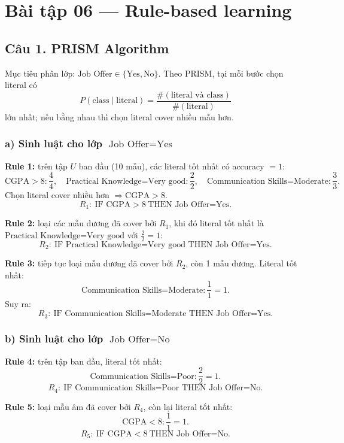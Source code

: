 \section*{Bài tập 06 --- Rule-based learning}

\subsection*{Câu 1. PRISM Algorithm}

Mục tiêu phân lớp: \(\text{Job Offer} \in \{\text{Yes}, \text{No}\}\).
Theo PRISM, tại mỗi bước chọn literal có
\[
P(\text{class} \mid \text{literal})=\frac{\#(\text{literal và class})}{\#(\text{literal})}
\]
lớn nhất; nếu bằng nhau thì chọn literal cover nhiều mẫu hơn.

\subsubsection*{a) Sinh luật cho lớp \(\text{Job Offer}=\text{Yes}\)}

\textbf{Rule 1:}
trên tập \(U\) ban đầu (10 mẫu), các literal tốt nhất có accuracy \(=1\):
\[
\text{CGPA}>8:\frac{4}{4},\quad
\text{Practical Knowledge=Very good}:\frac{2}{2},\quad
\text{Communication Skills=Moderate}:\frac{3}{3}.
\]
Chọn literal cover nhiều hơn \(\Rightarrow \text{CGPA}>8\).
\[
R_1:\ \text{IF CGPA}>8\ \text{THEN Job Offer=Yes}.
\]

\textbf{Rule 2:}
loại các mẫu dương đã cover bởi \(R_1\), khi đó literal tốt nhất là
\(\text{Practical Knowledge=Very good}\) với \(\frac{2}{2}=1\):
\[
R_2:\ \text{IF Practical Knowledge=Very good THEN Job Offer=Yes}.
\]

\textbf{Rule 3:}
tiếp tục loại mẫu dương đã cover bởi \(R_2\), còn 1 mẫu dương.
Literal tốt nhất:
\[
\text{Communication Skills=Moderate}:\frac{1}{1}=1.
\]
Suy ra:
\[
R_3:\ \text{IF Communication Skills=Moderate THEN Job Offer=Yes}.
\]

\subsubsection*{b) Sinh luật cho lớp \(\text{Job Offer}=\text{No}\)}

\textbf{Rule 4:}
trên tập ban đầu, literal tốt nhất:
\[
\text{Communication Skills=Poor}:\frac{2}{2}=1.
\]
\[
R_4:\ \text{IF Communication Skills=Poor THEN Job Offer=No}.
\]

\textbf{Rule 5:}
loại mẫu âm đã cover bởi \(R_4\), còn lại literal tốt nhất:
\[
\text{CGPA}<8:\frac{1}{1}=1.
\]
\[
R_5:\ \text{IF CGPA}<8\ \text{THEN Job Offer=No}.
\]

